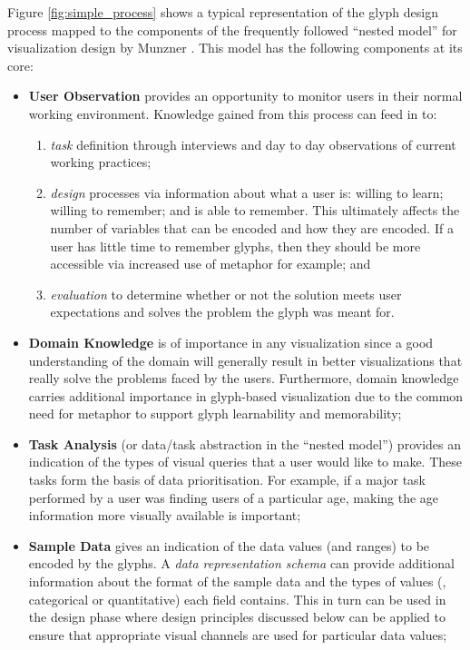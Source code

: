Figure \ref{fig:simple_process} shows a typical representation of the glyph design process mapped to the components of the frequently followed ``nested model'' for visualization design by Munzner \cite{munzner2009nested}.
This model has the following components at its core:

\begin{itemize}
\item \textbf{User Observation} provides an opportunity to monitor users in their normal working environment.
Knowledge gained from this process can feed in to:
\begin{enumerate}
	\item \emph{task} definition through interviews and day to day observations of current working practices;
	\item \emph{design} processes via information about what a user is: willing to learn; willing to remember; and is able to remember. This ultimately affects the number of variables that can be encoded and how they are encoded. If a user has little time to remember glyphs, then they should be more accessible via increased use of metaphor for example; and 
	\item \emph{evaluation} to determine whether or not the solution meets user expectations and solves the problem the glyph was meant for.
\end{enumerate}

\item \textbf{Domain Knowledge} is of importance in any visualization since a good understanding of the domain will generally result in better visualizations that really solve the problems faced by the users.
Furthermore, domain knowledge carries additional importance in glyph-based visualization due to the common need for metaphor to support glyph learnability and memorability;

\item \textbf{Task Analysis} (or data/task abstraction in the ``nested model'') provides an indication of the types of visual queries that a user would like to make.
These tasks form the basis of data prioritisation.
For example, if a major task performed by a user was finding users of a particular age, making the age information more visually available is important;

\item \textbf{Sample Data} gives an indication of the data values (and ranges) to be encoded by the glyphs.
A \emph{data representation schema} can provide additional information about the format of the sample data and the types of values  (\eg, categorical or quantitative) each field contains.
This in turn can be used in the design phase where design principles discussed below can be applied to ensure that appropriate visual channels are used for particular data values;


\end{itemize}
